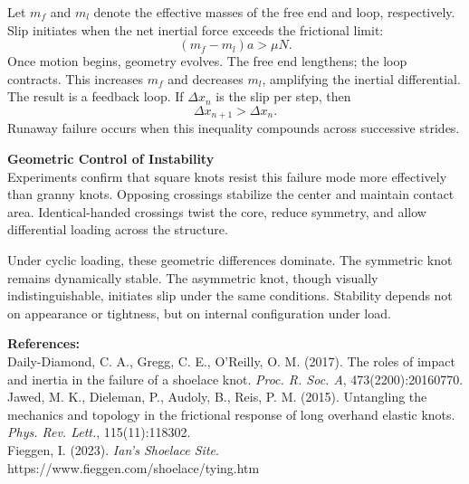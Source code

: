 \begin{technical}
Let $m_f$ and $m_l$ denote the effective masses of the free end and loop, respectively. Slip initiates when the net inertial force exceeds the frictional limit:
$$
(m_f - m_l) a > \mu N.
$$
Once motion begins, geometry evolves. The free end lengthens; the loop contracts. This increases $m_f$ and decreases $m_l$, amplifying the inertial differential. The result is a feedback loop. If $\Delta x_n$ is the slip per step, then
$$
\Delta x_{n+1} > \Delta x_n.
$$
Runaway failure occurs when this inequality compounds across successive strides.

\textbf{Geometric Control of Instability}\\[0.5em]
Experiments confirm that square knots resist this failure mode more effectively than granny knots. Opposing crossings stabilize the center and maintain contact area. Identical-handed crossings twist the core, reduce symmetry, and allow differential loading across the structure.

Under cyclic loading, these geometric differences dominate. The symmetric knot remains dynamically stable. The asymmetric knot, though visually indistinguishable, initiates slip under the same conditions. Stability depends not on appearance or tightness, but on internal configuration under load.

\vspace{0.5em}
\textbf{References:}\\
Daily-Diamond, C. A., Gregg, C. E., O'Reilly, O. M. (2017). The roles of impact and inertia in the failure of a shoelace knot. \textit{Proc. R. Soc. A}, 473(2200):20160770.\\
Jawed, M. K., Dieleman, P., Audoly, B., Reis, P. M. (2015). Untangling the mechanics and topology in the frictional response of long overhand elastic knots. \textit{Phys. Rev. Lett.}, 115(11):118302.\\
Fieggen, I. (2023). \textit{Ian's Shoelace Site}. https://www.fieggen.com/shoelace/tying.htm
\end{technical}
